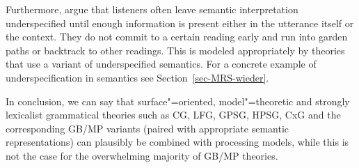 Furthermore, \citet[--54]{SW2015a} argue that listeners often leave semantic
interpretation underspecified until enough information is present either in the utterance itself or
 the context. They do not commit to a certain reading early and run into garden paths or backtrack
to other readings. This is modeled appropriately by theories that use a variant of underspecified
semantics. For a concrete example of underspecification in semantics see Section~\ref{sec-MRS-wieder}.

In conclusion, we can say that surface"=oriented, model"=theoretic and strongly lexicalist
grammatical theories such as CG, LFG, GPSG, HPSG, CxG and the corresponding GB/MP variants (paired with appropriate semantic representations) can plausibly be combined with processing
models, while this is not the case for the overwhelming majority of GB/MP theories.


